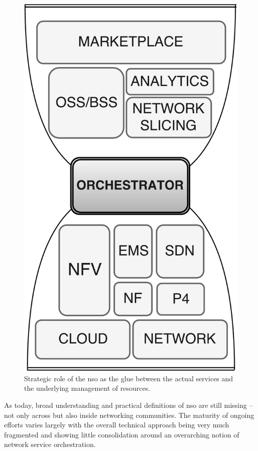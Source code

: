 \begin{figure}[t!]
  \centering
  \includegraphics[scale=.2]{Figures/01_Introduction/orchestrator.pdf}
    \caption{Strategic role of the \gls{nso} as the glue between the actual services and the underlying management of resources.}
    \label{orch}
\end{figure}

As today, broad understanding and practical definitions of \gls{nso} are still missing -- not only across but also inside networking communities. The maturity of ongoing efforts varies largely with the overall technical approach being very much fragmented and showing little consolidation around an overarching notion of network service orchestration. %

